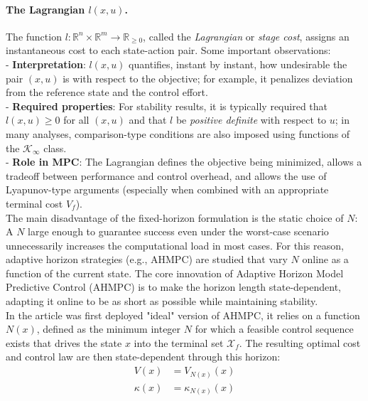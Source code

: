 \paragraph{The Lagrangian \(l(x,u)\).}
The function \(l:\mathbb{R}^n\times\mathbb{R}^m\to\mathbb{R}_{\ge 0}\), called the \emph{Lagrangian} or
\emph{stage cost}, assigns an instantaneous cost to each state-action pair. Some important
observations:
\\
\noindent
- \textbf{Interpretation}: \(l(x,u)\) quantifies, instant by instant, how undesirable the pair \((x,u)\)
is with respect to the objective; for example, it penalizes deviation from the reference state
and the control effort.
\\
\noindent
- \textbf{Required properties}: For stability results, it is typically required that
\(l(x,u)\ge 0\) for all \((x,u)\) and that \(l\) be \emph{positive definite} with respect to \(u\);
in many analyses, comparison-type conditions are also imposed using functions of the \(\mathcal{K}_\infty\) class.
\\
\noindent
- \textbf{Role in MPC}: The Lagrangian defines the objective being minimized,
allows a tradeoff between performance and control overhead, and allows the use of Lyapunov-type arguments
(especially when combined with an appropriate terminal cost \(V_f\)).
\\
\noindent
The main disadvantage of the fixed-horizon formulation is the static choice of \(N\):
A \(N\) large enough to guarantee success even under the worst-case scenario
unnecessarily increases the computational load in most cases. For this reason,
adaptive horizon strategies (e.g., AHMPC) are studied that vary \(N\) online
as a function of the current state.
The core innovation of Adaptive Horizon Model Predictive Control (AHMPC) is to make the horizon length state-dependent, adapting it online to be as short as possible while maintaining stability.
\\
\noindent
In the article \cite{krener2016adaptive} was first deployed "ideal" version of AHMPC, it relies on a function $N(x)$, defined as the minimum integer $N$ for which a feasible control sequence exists that drives the state $x$ into the terminal set $\mathcal{X}_f$. The resulting optimal cost and control law are then state-dependent through this horizon:
\begin{subequations}
\begin{align}
    V(x) &= V_{N(x)}(x) \label{eq:ideal_cost} \\
    \kappa(x) &= \kappa_{N(x)}(x) \label{eq:ideal_control}
\end{align}
\end{subequations}
